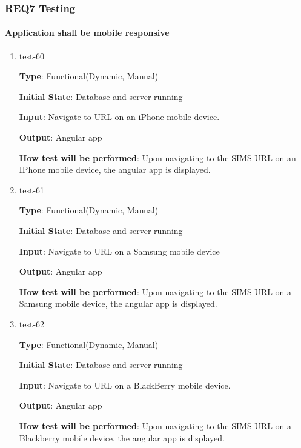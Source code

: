 \documentclass[12pt, titlepage]{article}
\begin{document}
\subsubsection{REQ7 Testing}
		
\paragraph{Application shall be mobile responsive}

\begin{enumerate}
\item{test-60\\}

\textbf{Type}: Functional(Dynamic, Manual)

\textbf{Initial State}: Database and server running

\textbf{Input}: Navigate to URL on an iPhone mobile device.
					
\textbf{Output}: Angular app
					
\textbf{How test will be performed}: Upon navigating to the SIMS URL on an IPhone mobile device, the angular app is displayed.
					
\item{test-61\\}

\textbf{Type}: Functional(Dynamic, Manual)
					
\textbf{Initial State}: Database and server running

\textbf{Input}: Navigate to URL on a Samsung mobile device
					
\textbf{Output}: Angular app
					
\textbf{How test will be performed}: Upon navigating to the SIMS URL on a Samsung mobile device, the angular app is displayed.
					
\item{test-62\\}

\textbf{Type}: Functional(Dynamic, Manual) 
	
\textbf{Initial State}: Database and server running

\textbf{Input}: Navigate to URL on a BlackBerry mobile device.
					
\textbf{Output}: Angular app
					
\textbf{How test will be performed}: Upon navigating to the SIMS URL on a Blackberry mobile device, the angular app is displayed.

\end{enumerate}
\end{document}
